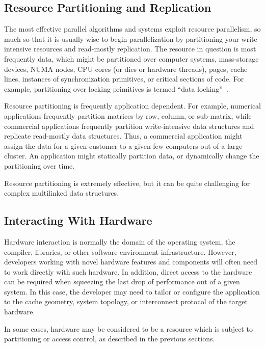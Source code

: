 \subsection{Resource Partitioning and Replication}
\label{sec:Resource Partitioning and Replication}

The most effective parallel algorithms and systems exploit resource
parallelism, so much so that it is
usually wise to begin parallelization by partitioning your write-intensive
resources and 
{read-mostly replication}.
The resource in question is most frequently data, which might be
partitioned over computer systems, mass-storage devices, NUMA nodes,
CPU cores (or dies or hardware threads), pages, cache lines, instances
of synchronization primitives, or critical sections of code.
For example, partitioning over locking primitives is termed
``data locking''~\cite{Beck85}.

Resource partitioning is frequently application dependent.
For example, numerical applications frequently partition matrices
by row, column, or sub-matrix, while commercial applications frequently
partition write-intensive data structures and replicate
read-mostly data structures.
Thus, a commercial application might assign the data for a
given customer to a given few computers out of a large cluster.
An application might statically partition data, or dynamically
change the partitioning over time.

Resource partitioning is extremely effective, but
it can be quite challenging for complex multilinked data
structures.

\subsection{Interacting With Hardware}
\label{sec:Interacting With Hardware}

Hardware interaction is normally the domain of the operating system,
the compiler, libraries, or other software-environment infrastructure.
However, developers working with novel hardware features and components
will often need to work directly with such hardware.
In addition, direct access to the hardware can be required when squeezing
the last drop of performance out of a given system.
In this case, the developer may need to tailor or configure the application
to the cache geometry, system topology, or interconnect protocol of the
target hardware.

In some cases, hardware may be considered to be a resource which
is subject to partitioning or access control, as described in
the previous sections.

